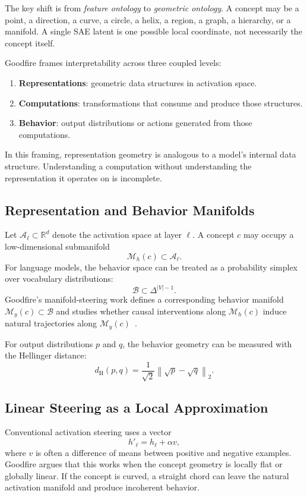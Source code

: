 \documentclass[11pt,a4paper]{article}
\newcommand{\Mh}{\mathcal{M}_h}
\newcommand{\My}{\mathcal{M}_y}
\newcommand{\Acal}{\mathcal{A}}
\newcommand{\Bcal}{\mathcal{B}}
\newcommand{\Hellinger}{d_{\mathrm{H}}}
\begin{document}
\begin{keyinsight}
The key shift is from \emph{feature ontology} to \emph{geometric ontology}. A concept may be a point, a direction, a curve, a circle, a helix, a region, a graph, a hierarchy, or a manifold. A single SAE latent is one possible local coordinate, not necessarily the concept itself.
\end{keyinsight}

Goodfire frames interpretability across three coupled levels:
\begin{enumerate}[noitemsep]
  \item \textbf{Representations}: geometric data structures in activation space.
  \item \textbf{Computations}: transformations that consume and produce those structures.
  \item \textbf{Behavior}: output distributions or actions generated from those computations.
\end{enumerate}
In this framing, representation geometry is analogous to a model's internal data structure. Understanding a computation without understanding the representation it operates on is incomplete.

\subsection{Representation and Behavior Manifolds}

Let $\Acal_\ell \subset \mathbb{R}^{d}$ denote the activation space at layer $\ell$. A concept $c$ may occupy a low-dimensional submanifold
\[
  \Mh(c) \subset \Acal_\ell.
\]
For language models, the behavior space can be treated as a probability simplex over vocabulary distributions:
\[
  \Bcal \subset \Delta^{|V|-1}.
\]
Goodfire's manifold-steering work defines a corresponding behavior manifold $\My(c) \subset \Bcal$ and studies whether causal interventions along $\Mh(c)$ induce natural trajectories along $\My(c)$~\citep{wurgaft2026manifoldsteering}.

For output distributions $p$ and $q$, the behavior geometry can be measured with the Hellinger distance:
\[
  \Hellinger(p,q) = \frac{1}{\sqrt{2}}\left\|\sqrt{p}-\sqrt{q}\right\|_2.
\]

\subsection{Linear Steering as a Local Approximation}

Conventional activation steering uses a vector
\[
  h'_\ell = h_\ell + \alpha v,
\]
where $v$ is often a difference of means between positive and negative examples. Goodfire argues that this works when the concept geometry is locally flat or globally linear. If the concept is curved, a straight chord can leave the natural activation manifold and produce incoherent behavior.
\end{document}
